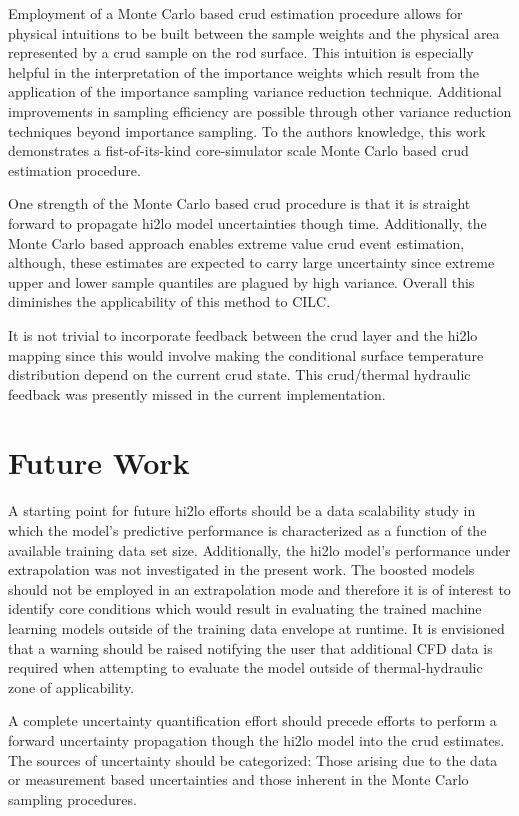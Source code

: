 Employment of a Monte Carlo based crud estimation procedure allows for physical intuitions to be built between the sample weights and the physical area represented by a crud sample on the rod surface.  This intuition is especially helpful in the interpretation of the importance weights which result from the application of the importance sampling variance reduction technique.  Additional improvements in sampling efficiency are possible through other variance reduction techniques beyond importance sampling.  To the authors knowledge, this work demonstrates a fist-of-its-kind core-simulator scale Monte Carlo based crud estimation procedure.

One strength of the Monte Carlo based crud procedure is that it is straight forward to propagate hi2lo model uncertainties though time.  Additionally, the Monte Carlo based approach enables extreme value crud event estimation, although, these estimates are expected to carry large uncertainty since extreme upper and lower sample quantiles are plagued by high variance.  Overall this diminishes the applicability of this method to CILC.  

It is not trivial to incorporate feedback between the crud layer and the hi2lo mapping since this would involve making the conditional surface temperature distribution depend on the current crud state.  This crud/thermal hydraulic feedback was presently missed in the current implementation.


\section{Future Work}

A starting point for future hi2lo efforts should be a data scalability study in which the model's predictive performance is characterized as a function of the available training data set size.  Additionally,
the hi2lo model's performance under extrapolation was not investigated in the present work.  The boosted models should not be employed in an extrapolation mode and therefore it is of interest to identify core conditions which would result in evaluating the trained machine learning models outside of the training data envelope at runtime.  It is envisioned that a warning should be raised notifying the user that additional CFD data is required when attempting to evaluate the model outside of thermal-hydraulic zone of applicability.

A complete uncertainty quantification effort should precede efforts to perform a forward uncertainty propagation though the hi2lo model into the crud estimates.  The sources of uncertainty should be categorized: Those arising due to the data or measurement based uncertainties and those inherent in the Monte Carlo sampling procedures.  

